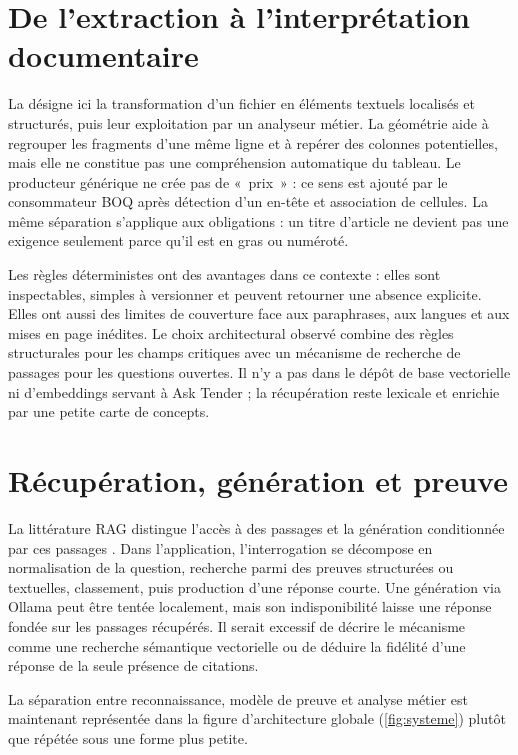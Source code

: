 \section{De l'extraction à l'interprétation documentaire}
La \DI{} désigne ici la transformation d'un fichier en éléments textuels localisés et structurés, puis leur exploitation par un analyseur métier. La géométrie aide à regrouper les fragments d'une même ligne et à repérer des colonnes potentielles, mais elle ne constitue pas une compréhension automatique du tableau. Le producteur générique ne crée pas de «~prix~» : ce sens est ajouté par le consommateur BOQ après détection d'un en-tête et association de cellules. La même séparation s'applique aux obligations : un titre d'article ne devient pas une exigence seulement parce qu'il est en gras ou numéroté.

Les règles déterministes ont des avantages dans ce contexte : elles sont inspectables, simples à versionner et peuvent retourner une absence explicite. Elles ont aussi des limites de couverture face aux paraphrases, aux langues et aux mises en page inédites. Le choix architectural observé combine des règles structurales pour les champs critiques avec un mécanisme de recherche de passages pour les questions ouvertes. Il n'y a pas dans le dépôt de base vectorielle ni d'embeddings servant à Ask Tender ; la récupération reste lexicale et enrichie par une petite carte de concepts.

\section{Récupération, génération et preuve}
La littérature RAG distingue l'accès à des passages et la génération conditionnée par ces passages \cite{rag}. Dans l'application, l'interrogation se décompose en normalisation de la question, recherche parmi des preuves structurées ou textuelles, classement, puis production d'une réponse courte. Une génération via Ollama peut être tentée localement, mais son indisponibilité laisse une réponse fondée sur les passages récupérés. Il serait excessif de décrire le mécanisme comme une recherche sémantique vectorielle ou de déduire la fidélité d'une réponse de la seule présence de citations.

La séparation entre reconnaissance, modèle de preuve et analyse métier est maintenant représentée dans la figure d'architecture globale (\autoref{fig:systeme}) plutôt que répétée sous une forme plus petite.

